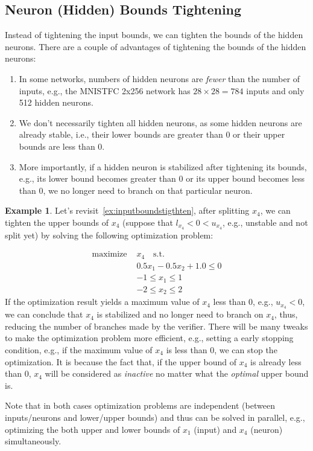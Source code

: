 \documentclass[oneside,11pt,dvipsnames]{book}
\numberwithin{equation}{section}
\theoremstyle{definition}
\newtheorem{example}{Example}[section]
\theoremstyle{remark}
\newcommand{\tvn}[1]{\iftoggle{usecomment}{{\color{red}{[TVN]: #1}}}{}}
\begin{document}
\subsection{Neuron (Hidden) Bounds Tightening}\label{sec:neuronboundstigthten}

Instead of tightening the input bounds, we can tighten the bounds of the hidden neurons.
There are a couple of advantages of tightening the bounds of the hidden neurons:
\begin{enumerate}
\item In some networks, numbers of hidden neurons are \emph{fewer} than the number of inputs, e.g., the MNISTFC 2x256 network has $28\times 28 = 784$ inputs and only 512 hidden neurons.
\item We don't necessarily tighten all hidden neurons, as some hidden neurons are already stable, i.e., their lower bounds are greater than 0 or their upper bounds are less than 0.
\item More importantly, if a hidden neuron is stabilized after tightening its bounds, e.g., its lower bound becomes greater than 0 or its upper bound becomes less than 0, we no longer need to branch on that particular neuron.
\end{enumerate}

\begin{example}\label{ex:neuronboundstigthten}
Let's revisit~\autoref{ex:inputboundstigthten}, after splitting $x_4$\tvn{you wrote $x_3$ here, did you mean $x_4$?}, we can tighten the upper bounds of $x_4$ (suppose that $l_{x_4} < 0 < u_{x_4}$, e.g., unstable and not split yet) by solving the following optimization problem:

\begin{equation}
\begin{aligned}
\text{maximize~} &x_4 \quad \text{s.t.} \\
& 0.5x_1 - 0.5x_2 + 1.0 \le 0 \\
& -1 \le x_1 \le 1 \\
& -2 \le x_2 \le 2
\end{aligned}
\end{equation}
If the optimization result yields a maximum value of $x_4$ less than 0, e.g., $u_{x_4} < 0$, we can conclude that $x_4$ is stabilized and no longer need to branch on $x_4$, thus, reducing the number of branches made by the verifier.
There will be many tweaks to make the optimization problem more efficient, e.g., setting a early stopping condition, e.g., if the maximum value of $x_4$ is less than 0, we can stop the optimization. It is because the fact that, if the upper bound of $x_4$ is already less than 0, $x_4$ will be considered as \emph{inactive} no matter what the \emph{optimal} upper bound is.

Note that in both cases optimization problems are independent (between inputs/neurons and lower/upper bounds) and thus can be solved in parallel, e.g., optimizing the both upper and lower bounds of $x_1$ (input) and $x_4$ (neuron) simultaneously.
\end{example}
\end{document}
